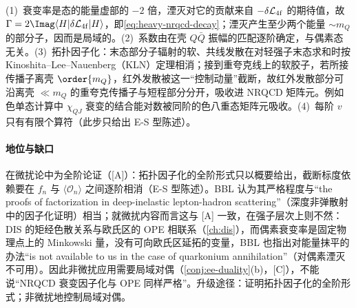 \begin{proofsketch}
(1)~衰变率是态的能量虚部的 $-2$ 倍，湮灭对它的贡献来自 $-\delta\mathcal L_{\rm 4f}$ 的期待值，故 $\Gamma=2\Imag\langle H|\delta\mathcal L_{\rm 4f}|H\rangle$，即\cref{eq:heavy-nrqcd-decay}\cite[式~(2.13)--(2.14)]{BodwinBraatenLepage1995}；湮灭产生至少两个能量 $\sim m_Q$ 的部分子，因而是局域的\cite[第~II.E~节]{BodwinBraatenLepage1995}。(2)~系数由在壳 $Q\bar Q$ 振幅的匹配逐阶确定，与偶素态无关。(3)~拓扑因子化\cite[第~V.A~节]{BodwinBraatenLepage1995}：末态部分子辐射的软、共线发散在对轻强子末态求和时按 Kinoshita--Lee--Nauenberg（KLN）定理相消；接到重夸克线上的软胶子，若所接传播子离壳 $\order{m_Q}$，红外发散被这一“控制动量”截断，故红外发散部分可沿离壳 $\ll m_Q$ 的重夸克传播子与短程部分分开，吸收进 NRQCD 矩阵元。例如色单态计算中 $\chi_{QJ}$ 衰变的结合能对数\cite{Barbieri:1975am}被同阶的色八重态矩阵元吸收\cite{Bodwin:1992ye}。(4)~每阶 $v$ 只有有限个算符（此步只给出 E-S 型陈述）。
\end{proofsketch}

\paragraph{地位与缺口}
在微扰论中为全阶论证（[A]）：拓扑因子化的全阶形式只以概要给出，截断标度依赖要在 $f_n$ 与 $\langle\mathcal O_n\rangle$ 之间逐阶相消（E-S 型陈述）。BBL 认为其严格程度与“the proofs of factorization in deep-inelastic lepton-hadron scattering”（深度非弹散射中的因子化证明）相当\cite[第~VI.A~节]{BodwinBraatenLepage1995}；就微扰内容而言这与 [A] 一致，在强子层次上则不然：DIS 的矩经色散关系与欧氏区的 OPE 相联系（\cref{ch:dis}），而偶素衰变率是固定物理点上的 Minkowski 量，没有可向欧氏区延拓的变量，BBL 也指出对能量抹平的办法“is not available to us in the case of quarkonium annihilation”（对偶素湮灭不可用）\cite[第~II.E~节]{BodwinBraatenLepage1995}。因此非微扰应用需要局域对偶（\cref{conj:ee-duality}(b)，[C]），不能说“NRQCD 衰变因子化与 OPE 同样严格”。升级途径：证明拓扑因子化的全阶形式；非微扰地控制局域对偶。

